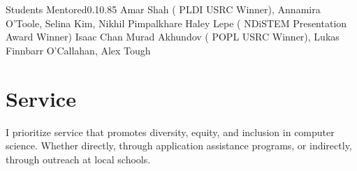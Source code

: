 \documentclass{federico_cv}
\begin{document}
\begin{tblSubSection}{Students Mentored}{0.1}{0.85}
{Amar Shah (
{PLDI  USRC Winner}), Annamira O'Toole, Selina Kim, Nikhil Pimpalkhare}
{Haley Lepe
(
{NDiSTEM  Presentation Award Winner})}
{Isaac Chan}
{Murad Akhundov
(
{POPL  USRC Winner}), Lukas Finnbarr O'Callahan, Alex Tough}
\end{tblSubSection}


\section{Service}


I prioritize service that promotes diversity, equity, and inclusion in computer
science. Whether directly, through application assistance programs, or
indirectly, through outreach at local schools.
\end{document}
